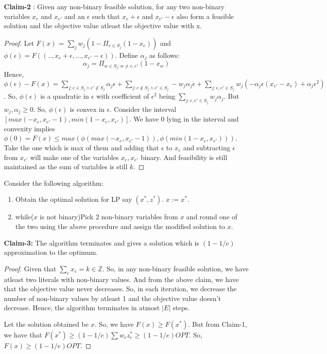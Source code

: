 \documentclass{article}
\newcommand{\size}[1]{|#1|}
\begin{document}
\noindent
\textbf{Claim-2} : Given any non-binary feasible solution, for any two non-binary variables $x_e$ and $x_{e'}$ and an $\epsilon$ such that $x_e + \epsilon$ and $x_{e'} - \epsilon$ also form a feasible solution and the objective value atleast the objective value with x.
\begin{proof}
Let $F(x)$ = $\sum_{j}w_j(1- \Pi_{e \in S_j}(1-x_{e}))$ and $\phi(\epsilon) = F((..,x_e+\epsilon,...,x_{e'}-\epsilon))$. Define $\alpha_j$ as follows:
\begin{equation}
    \alpha_j = \Pi_{w \in S_j : w \ne e,e'}(1 - x_w)
\end{equation}
Hence, $\phi(\epsilon) - F(x) = \sum_{j : e \in S_j \land e' \notin S_j}\alpha_j\epsilon + \sum_{j : e \notin S_j \land e' \in S_j} -w_j\alpha_j\epsilon + \sum_{j : e,e' \in S_j} w_j(-\alpha_j\epsilon(x_{e'} - x_e) + \alpha_j\epsilon^2)$. So, $\phi(\epsilon)$ is a quadratic in $\epsilon$ with coefficient of $\epsilon^2$ being $\sum_{j : e,e' \in S_j}w_j\alpha_j$. But $w_j,\alpha_j \geq 0$. So, $\phi(\epsilon)$ is convex in $\epsilon$. Consider the interval $[max(-x_e, x_{e'} -1), min(1 - x_e, x_{e'})]$. We have $0$ lying in the interval and convexity implies $\phi(0) = F(x) \leq max(\phi(max(-x_e, x_{e'} -1)),\phi(min(1 - x_e, x_{e'})))$. Take the one which is max of them and adding that $\epsilon$ to $x_e$ and subtracting $\epsilon$ from $x_{e'}$ will make one of the variables $x_e, x_{e'}$ binary. And feasibility is still maintained as the sum of variables is still $k$.
\end{proof}
Consider the following algorithm:
\begin{enumerate}
    \item Obtain the optimal solution for LP say $(x^*,z^*)$. $x := x^*$.
    \item while($x$ is not binary){Pick 2 non-binary variables from $x$ and round one of the two using the above procedure and assign the modified solution to $x$}.
\end{enumerate}
\textbf{Claim-3:} The algorithm terminates and gives a solution which is $(1-1/e)$ approximation to the optimum.
\begin{proof}
Given that $\sum_{e}x_e = k \in \mathbb{Z}$. So, in any non-binary feasible solution, we have atleast two literals with non-binary values. And from the above claim, we have that the objective value never decreases.  So, in each iteration, we decrease the number of non-binary values by atleast 1 and the objective value doesn't decrease. Hence, the algorithm terminates in atmost $\size{E}$ steps.

Let the solution obtained be $x$. So, we have $F(x) \geq F(x^*)$. But from Claim-1, we have that $F(x^*) \geq (1-1/e)\sum w_ez_e^* \geq (1-1/e)OPT$. So, $F(x) \geq (1-1/e)OPT$.\end{proof}
\end{document}
